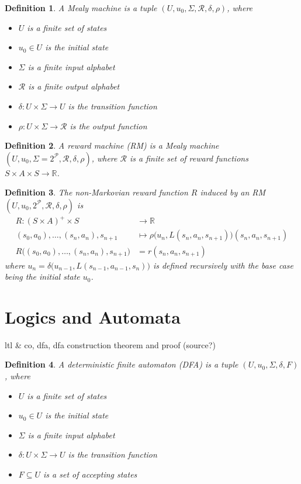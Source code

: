 \documentclass[12pt, a4paper]{article}
\theoremstyle{plain}
\newtheorem*{definition}{Definition}
\begin{document}
\begin{definition}
	A \emph{Mealy machine} is a tuple $(U, u_0, \Sigma, \mathcal{R}, \delta, \rho)$, where
	\begin{itemize}
		\item $U$ is a finite set of states
		\item $u_0 \in U$ is the initial state
		\item $\Sigma$ is a finite input alphabet
		\item $\mathcal{R}$ is a finite output alphabet
		\item $\delta : U \times \Sigma \to U$ is the transition function
		\item $\rho : U \times \Sigma \to \mathcal{R}$ is the output function
	\end{itemize}
\end{definition}

\begin{definition}
	A \emph{reward machine (RM)} is a Mealy machine $(U, u_0, \Sigma = 2^\mathcal{P}, \mathcal{R}, \delta, \rho)$, where $\mathcal{R}$ is a finite set of reward functions $S \times A \times S \to \mathbb{R}$.
\end{definition}

\begin{definition}
	The non-Markovian reward function $R$ \emph{induced by an RM} $(U, u_0, 2^\mathcal{P}, \mathcal{R}, \delta, \rho)$ is
	\begin{align*}
		R : (S \times A)^+ \times S                       & \to \mathbb{R}                                                     \\
		(s_0, a_0), \dots, (s_n, a_n), s_{n+1}            & \mapsto \rho\big(u_n, L(s_n, a_n, s_{n+1})\big)(s_n, a_n, s_{n+1}) \\
		R\big((s_0, a_0), \dots, (s_n, a_n), s_{n+1}\big) & = r(s_n, a_n, s_{n+1})
	\end{align*}
	where $u_n = \delta\big(u_{n-1}, L(s_{n-1}, a_{n-1}, s_n)\big)$ is defined recursively with the base case being the initial state $u_0$.
\end{definition}

\section*{Logics and Automata}

ltl \& co, dfa, dfa construction theorem and proof (source?)

\begin{definition}
	A \emph{deterministic finite automaton (DFA)} is a tuple $(U, u_0, \Sigma, \delta, F)$, where
	\begin{itemize}
		\item $U$ is a finite set of states
		\item $u_0 \in U$ is the initial state
		\item $\Sigma$ is a finite input alphabet
		\item $\delta : U \times \Sigma \to U$ is the transition function
		\item $F \subseteq U$ is a set of accepting states
	\end{itemize}
\end{definition}
\end{document}
